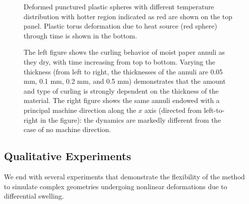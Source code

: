 \documentclass[timestamp,acmtog]{acmart}
\begin{document}
\begin{figure}[!h]
\begin{minipage}[t]{0.45\linewidth}
    \caption{Deformed punctured plastic spheres with different temperature distribution with hotter region indicated as red are shown on the top panel. Plastic torus deformation due to heat source (red sphere) through time is shown in the bottom. }
    \label{fig:TorusandSphere}
\end{minipage}        
\end{figure}

\begin{figure}[h]
  \centering
  \caption{The left figure shows the curling behavior of moist paper annuli as they dry, with time increasing from top to bottom. Varying the thickness (from left to right, the thicknesses of the annuli are 0.05 mm, 0.1 mm, 0.2 mm, and 0.5 mm) demonstrates that the amount and type of curling is strongly dependent on the thickness of the material. The right figure shows the same annuli endowed with a principal machine direction along the $x$ axis (directed from left-to-right in the figure): the dynamics are markedly different from the case of no machine direction. }
  \label{Annuli}
\end{figure}

\subsection{Qualitative Experiments}
We end with several experiments that demonstrate the flexibility of the method to simulate complex geometries undergoing nonlinear deformations due to differential swelling.
\end{document}
